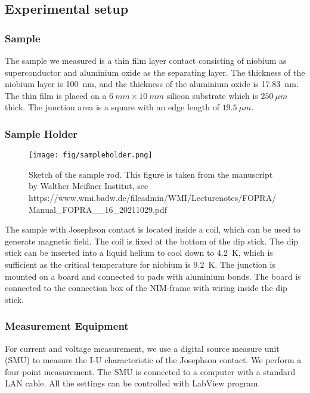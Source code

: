 \subsection{Experimental setup}

\subsubsection{Sample}
The sample we measured is a thin film layer contact consisting of niobium as superconductor and aluminium oxide as the separating layer. The thickness of the niobium layer is \SI{100}{nm}, and the thickness of the aluminium oxide is \SI{17.83}{nm}. The thin film is placed on a $\SI{6}{mm} \times \SI{10}{mm}$ silicon substrate which is $\SI{250}{\mu m}$ thick. The junction area is a square with an edge length of $\SI{19.5}{\mu m}$.

\subsubsection{Sample Holder}

\begin{figure}

\centering
\texttt{[image: fig/sampleholder.png]}

\caption{Sketch of the sample rod. This figure is taken from the manuscript by Walther Meißner Institut, see https://www.wmi.badw.de/fileadmin/WMI/Lecturenotes/FOPRA/Manual_FOPRA__16_20211029.pdf}

\label{sampleholder}
\end{figure}

The sample with Josephson contact is located inside a coil, which can be used to generate magnetic field. The coil is fixed at the bottom of the dip stick. The dip stick can be inserted into a liquid helium to cool down to \SI{4.2}{K}, which is sufficient as the critical temperature for niobium is \SI{9.2}{K}. The junction is mounted on a board and connected to pads with aluminium bonds. The board is connected to the connection box of the NIM-frame with wiring inside the dip stick.

\subsubsection{Measurement Equipment}
For current and voltage measurement, we use a digital source measure unit (SMU) to measure the I-U characteristic of the Josephson contact. We perform a four-point measurement. The SMU is connected to a computer with a standard LAN cable. All the settings can be controlled with LabView program.

